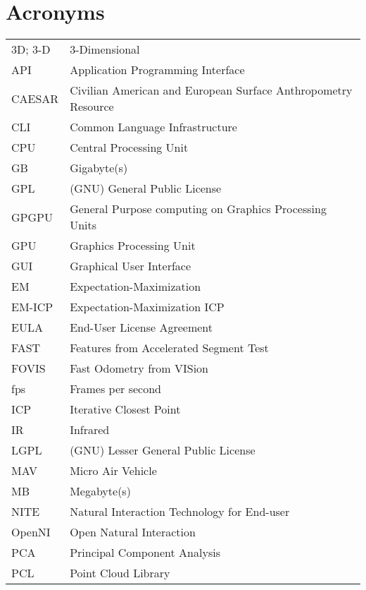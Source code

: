 \chapter*{Acronyms}


\noindent
\begin{longtable}{@{}p{}p{}@{}}
    3D; 3-D & 3-Dimensional \\
        API & Application Programming Interface \\
     CAESAR & Civilian American and European Surface Anthropometry Resource \\
        CLI & Common Language Infrastructure \\
        CPU & Central Processing Unit \\
         GB & Gigabyte(s) \\
        GPL & (GNU) General Public License \\
      GPGPU & General Purpose computing on Graphics Processing Units \\
        GPU & Graphics Processing Unit \\
        GUI & Graphical User Interface \\
         EM & Expectation-Maximization \\
     EM-ICP & Expectation-Maximization ICP \\
       EULA & End-User License Agreement \\
       FAST & Features from Accelerated Segment Test \\
      FOVIS & Fast Odometry from VISion \\
        fps & Frames per second \\
        ICP & Iterative Closest Point \\
         IR & Infrared \\
       LGPL & (GNU) Lesser General Public License \\
        MAV & Micro Air Vehicle \\
         MB & Megabyte(s) \\
       NITE & Natural Interaction Technology for End-user \\
     OpenNI & Open Natural Interaction \\
        PCA & Principal Component Analysis \\
        PCL & Point Cloud Library \\

\end{longtable}

